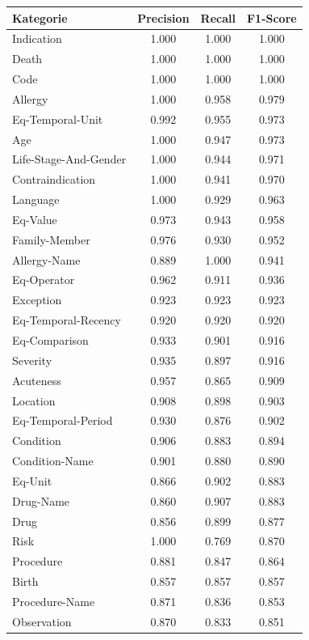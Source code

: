 \begin{table}[htbp]
\centering
\begin{tabular}{p{5cm}ccc}
\toprule
\textbf{Kategorie} & \textbf{Precision} & \textbf{Recall} & \textbf{F1-Score} \\
\midrule
Indication & 1.000 & 1.000 & 1.000 \\
Death & 1.000 & 1.000 & 1.000 \\
Code & 1.000 & 1.000 & 1.000 \\
Allergy & 1.000 & 0.958 & 0.979 \\
Eq-Temporal-Unit & 0.992 & 0.955 & 0.973 \\
Age & 1.000 & 0.947 & 0.973 \\
Life-Stage-And-Gender & 1.000 & 0.944 & 0.971 \\
Contraindication & 1.000 & 0.941 & 0.970 \\
Language & 1.000 & 0.929 & 0.963 \\
Eq-Value & 0.973 & 0.943 & 0.958 \\
Family-Member & 0.976 & 0.930 & 0.952 \\
Allergy-Name & 0.889 & 1.000 & 0.941 \\
Eq-Operator & 0.962 & 0.911 & 0.936 \\
Exception & 0.923 & 0.923 & 0.923 \\
Eq-Temporal-Recency & 0.920 & 0.920 & 0.920 \\
Eq-Comparison & 0.933 & 0.901 & 0.916 \\
Severity & 0.935 & 0.897 & 0.916 \\
Acuteness & 0.957 & 0.865 & 0.909 \\
Location & 0.908 & 0.898 & 0.903 \\
Eq-Temporal-Period & 0.930 & 0.876 & 0.902 \\
Condition & 0.906 & 0.883 & 0.894 \\
Condition-Name & 0.901 & 0.880 & 0.890 \\
Eq-Unit & 0.866 & 0.902 & 0.883 \\
Drug-Name & 0.860 & 0.907 & 0.883 \\
Drug & 0.856 & 0.899 & 0.877 \\
Risk & 1.000 & 0.769 & 0.870 \\
Procedure & 0.881 & 0.847 & 0.864 \\
Birth & 0.857 & 0.857 & 0.857 \\
Procedure-Name & 0.871 & 0.836 & 0.853 \\
Observation & 0.870 & 0.833 & 0.851 \\

\end{tabular}
\end{table}
